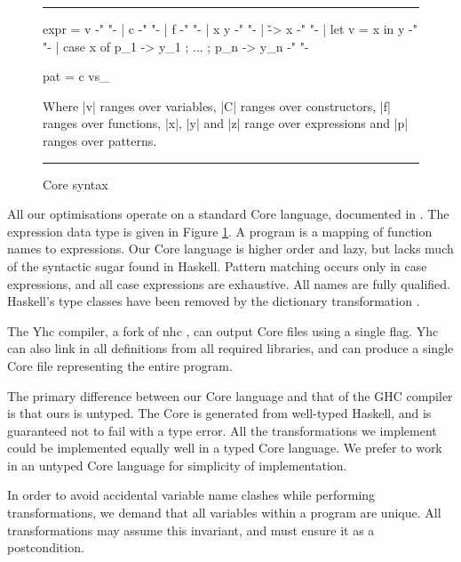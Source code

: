 \documentclass{llncs}
\newenvironment{fig}
    {\begin{figure}[tbp]\hrule}
    {\end{figure}}
\newcommand{\figend}{\hrule}
\begin{document}
\begin{fig}
\begin{code}
expr  =  v                                          {-"  "-}
      |  c                                          {-"  "-}
      |  f                                          {-"  "-}
      |  x y                                        {-"  "-}
      |  \v -> x                                    {-"  "-}
      |  let v = x in y                             {-"  "-}
      |  case x of {p_1 -> y_1 ; ... ; p_n -> y_n}  {-"  "-}

pat   =  c vs_
\end{code}

Where |v| ranges over variables, |C| ranges over constructors, |f| ranges over functions, |x|, |y| and |z| range over expressions and |p| ranges over patterns.
\bigskip
\figend
\caption{Core syntax}
\label{fig:core}
\end{fig}

All our optimisations operate on a standard Core language, documented in \cite{me:yhc_core}. The expression data type is given in Figure \ref{fig:core}. A program is a mapping of function names to expressions. Our Core language is higher order and lazy, but lacks much of the syntactic sugar found in Haskell. Pattern matching occurs only in case expressions, and all case expressions are exhaustive. All names are fully qualified. Haskell's type classes have been removed by the dictionary transformation \cite{wadler:type_classes}.

The Yhc compiler, a fork of nhc \cite{nhc}, can output Core files using a single flag. Yhc can also link in all definitions from all required libraries, and can produce a single Core file representing the entire program.

The primary difference between our Core language and that of the GHC compiler \cite{ghc_core} is that ours is untyped. The Core is generated from well-typed Haskell, and is guaranteed not to fail with a type error. All the transformations we implement could be implemented equally well in a typed Core language. We prefer to work in an untyped Core language for simplicity of implementation.

In order to avoid accidental variable name clashes while performing transformations, we demand that all variables within a program are unique. All transformations may assume this invariant, and must ensure it as a postcondition.
\end{document}
